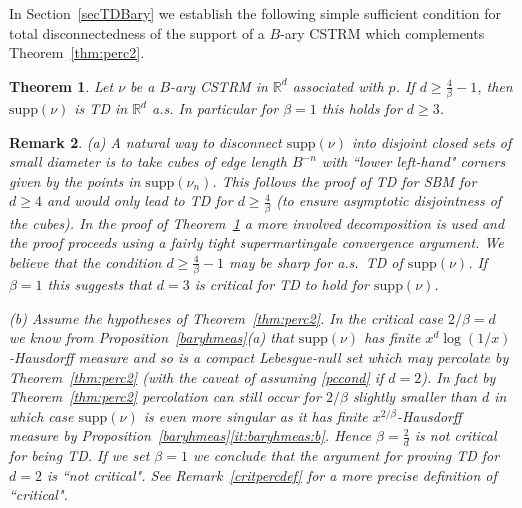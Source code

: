 \documentclass[12pt]{article}
\newtheorem{theorem}{Theorem}
\numberwithin{theorem}{section}
\newtheorem{remark}[theorem]{Remark}
\theoremstyle{def}
\numberwithin{equation}{section}
\newcommand{\R}{\mathbb{R}}
\newcommand{\supp}{\mathrm{supp}}
\begin{document}
In Section~\ref{secTDBary} we establish the following simple sufficient condition for total disconnectedness of the support of a $B$-ary CSTRM which complements Theorem~\ref{thm:perc2}.  
\begin{theorem}\label{thm:totdisc}
Let $\nu$ be a $B$-ary CSTRM in $\R^d$ associated with $p$.  
If $d\ge \frac{4}{\beta}-1$, then $\supp(\nu)$ is TD in $\R^d$ a.s.
In particular for $\beta=1$ this holds for $d\ge 3$.
\end{theorem}
\begin{remark}\label{TDforSTRM}
\emph{(a)} A natural way to disconnect $\supp(\nu)$ into disjoint closed sets of small diameter is to take cubes of edge length $B^{-n}$ with ``lower left-hand" corners given by the points in $\supp(\nu_n)$. 
This follows the proof of TD for SBM for $d\ge 4$ and would only lead to TD for $d\ge \frac{4}{\beta}$ (to ensure asymptotic disjointness of the cubes).  
In the proof of  Theorem~\ref{thm:totdisc} a more involved decomposition is used and  the proof proceeds using a fairly tight supermartingale convergence argument. 
We believe that the condition $d\ge \frac{4}{\beta}-1$ may be sharp for a.s.\ TD of $\supp(\nu)$.  
If $\beta=1$ this suggests that $d=3$ is critical for TD to hold for $\supp(\nu)$.  

\emph{(b)} Assume the hypotheses of Theorem~\ref{thm:perc2}. In the critical case $2/\beta=d$ we know from Proposition~\ref{baryhmeas}(a) that $\supp(\nu)$ has finite $x^d\log(1/x)$-Hausdorff measure and so is a compact Lebesgue-null set which may percolate by Theorem~\ref{thm:perc2} (with the caveat of assuming \eqref{pccond} if $d=2$).  In fact by Theorem~\ref{thm:perc2} percolation can still occur
for $2/\beta$ slightly smaller than $d$ in which case $\supp(\nu)$ is even more singular as it has finite $x^{2/\beta}$-Hausdorff measure by Proposition~\ref{baryhmeas}\ref{it:baryhmeas:b}. 
Hence $\beta=\frac{2}{d}$ is not critical for being TD. If we set $\beta=1$ we conclude that the argument for proving TD for $d=2$ is ``not critical". See Remark~\ref{critpercdef} for a  more precise definition of ``critical".
\end{remark}
		
\end{document}
